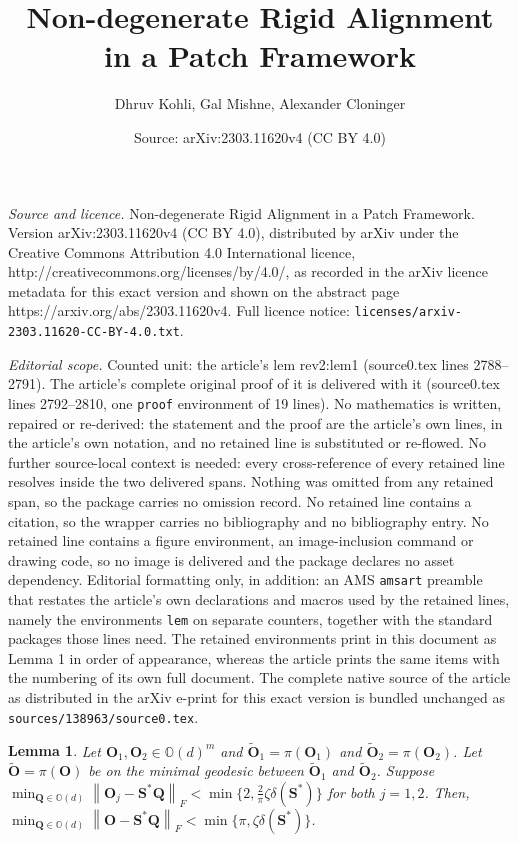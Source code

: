 \documentclass[10pt,a4paper]{amsart}
\title{Non-degenerate Rigid Alignment in a Patch Framework}
\author{Dhruv Kohli, Gal Mishne, Alexander Cloninger}
\date{Source: arXiv:2303.11620v4 (CC BY 4.0)}
\newtheorem{lem}{Lemma}
\begin{document}
\maketitle

\noindent\emph{Source and licence.} Non-degenerate Rigid Alignment in a Patch Framework. Version arXiv:2303.11620v4 (CC BY 4.0), distributed by arXiv under the Creative Commons Attribution 4.0 International licence, http://creativecommons.org/licenses/by/4.0/, as recorded in the arXiv licence metadata for this exact version and shown on the abstract page https://arxiv.org/abs/2303.11620v4. Full licence notice: \texttt{licenses/arxiv-2303.11620-CC-BY-4.0.txt}.\par\smallskip

\noindent\textit{Editorial scope.} Counted unit: the article's lem rev2:lem1 (source0.tex lines 2788--2791). The article's complete original proof of it is delivered with it (source0.tex lines 2792--2810, one \texttt{proof} environment of 19 lines). No mathematics is written, repaired or re-derived: the statement and the proof are the article's own lines, in the article's own notation, and no retained line is substituted or re-flowed.  No further source-local context is needed: every cross-reference of every retained line resolves inside the two delivered spans.  Nothing was omitted from any retained span, so the package carries no omission record.  No retained line contains a citation, so the wrapper carries no bibliography and no bibliography entry.  No retained line contains a figure environment, an image-inclusion command or drawing code, so no image is delivered and the package declares no asset dependency.  Editorial formatting only, in addition: an AMS \texttt{amsart} preamble that restates the article's own declarations and macros used by the retained lines, namely the environments \texttt{lem} on separate counters, together with the standard packages those lines need.  The retained environments print in this document as Lemma 1 in order of appearance, whereas the article prints the same items with the numbering of its own full document.  The complete native source of the article as distributed in the arXiv e-print for this exact version is bundled unchanged as \texttt{sources/138963/source0.tex}.
\begin{lem}
\label{rev2:lem1}
    Let $\mathbf{O}_1, \mathbf{O}_2 \in \mathbb{O}(d)^m$ and $\widetilde{\mathbf{O}}_1 = \pi(\mathbf{O}_1)$ and $\widetilde{\mathbf{O}}_2 = \pi(\mathbf{O}_2)$. Let $\widetilde{\mathbf{O}} = \pi(\mathbf{O})$ be on the minimal geodesic between $\widetilde{\mathbf{O}}_1$ and $\widetilde{\mathbf{O}}_2$. Suppose $\min_{\mathbf{Q} \in \mathbb{O}(d)}\left\|\mathbf{O}_j - \mathbf{S}^*\mathbf{Q}\right\|_F < \min\{2,\frac{2}{\pi}\zeta\delta(\mathbf{S}^*)\}$ for both $j =1, 2$. Then, $\min_{\mathbf{Q} \in \mathbb{O}(d)}\left\|\mathbf{O} - \mathbf{S}^*\mathbf{Q}\right\|_F < \min\{\pi, \zeta\delta(\mathbf{S}^*)\}$.
\end{lem}
\end{document}
